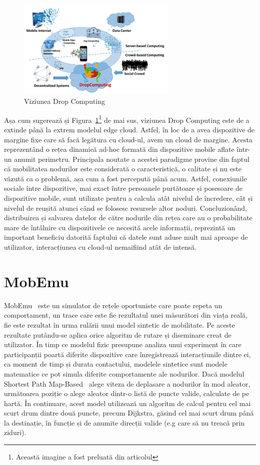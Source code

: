\documentclass[12pt,a4paper]{report}
\begin{document}
\begin{figure}[th]
\centering
\includegraphics[width=3in]{pics/dropComputing.png}
  \caption{Viziunea Drop Computing}
  \label{fig:pic2}
\end{figure}
Așa cum sugerează și Figura~\ref{fig:pic2}\footnote{Această imagine a fost preluată din articolul\cite{DC}} de mai sus, viziunea Drop Computing este de a extinde până la extrem modelul edge cloud. Astfel, în loc de a avea dispozitive de margine fixe care să facă legătura cu cloud-ul, avem un cloud de margine. Acesta reprezentând o rețea dinamică ad-hoc formată din dispozitive mobile aflate într-un anumit perimetru. Principala noutate a acestei paradigme provine din faptul că mobilitatea nodurilor este considerată o caracteristică, o calitate și nu este văzută ca o problemă, așa cum a fost percepută până acum. Astfel, conexiunile sociale între dispozitive, mai exact între persoanele purtătoare și posesoare de dispozitive mobile, sunt utilizate pentru a calcula atât nivelul de încredere, cât și nivelul de reușită atunci când se folosesc resursele altor noduri. Concluzionând, distribuirea și salvarea datelor de către nodurile din rețea care au o probabilitate mare de întâlnire cu dispozitivele ce necesită acele informații, reprezintă un important beneficiu datorită faptului că datele sunt aduse mult mai aproape de utilizator, interacțiunea cu cloud-ul nemaifiind atât de intensă.

\iffalse
\section{MobEmu}
MobEmu~\cite{MobEmuArticle} este un simulator de rețele oportuniste care poate repeta un comportament, un trace care este fie rezultatul unei măsurători din viața reală, fie este rezultat în urma rulării unui model sintetic de mobilitate. Pe aceste rezultate putându-se aplica orice algoritm de rutare și diseminare creat de utilizator.
În timp ce modelul fizic presupune analiza unui experiment în care participanții poartă diferite dispozitive care înregistrează interacțiunile dintre ei, ca moment de timp și durata contactului, modelele sintetice sunt modele matematice ce pot simula diferite comportamente ale nodurilor. Dacă modelul Shortest Path Map-Based~\cite{ShortestPathMapBased} alege viteza de deplasare a nodurilor în mod aleator, următoarea poziție o alege aleator dintr-o listă de puncte valide, calculate de pe hartă. În continuare, acest model utilizează un algoritm de calcul pentru cel mai scurt drum dintre două puncte, precum Dijkstra, găsind cel mai scurt drum până la destinație, în funcție și de anumite direcții valide (e.g care să nu treacă prin ziduri). 
\end{document}
